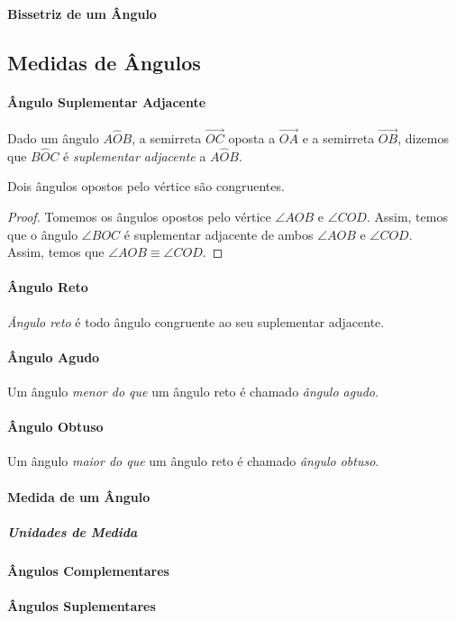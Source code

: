     \paragraph{Bissetriz de um Ângulo}
\subsection{Medidas de Ângulos}
	\paragraph{Ângulo Suplementar Adjacente}
    Dado um ângulo $A\hat{O}B$, a semirreta $\overrightarrow{OC}$ oposta a $\overrightarrow{OA}$ e a semirreta $\overrightarrow{OB}$, dizemos que $B\hat{O}C$ é \emph{suplementar adjacente} a $A\hat{O}B$. 
    \begin{prop}
Dois ângulos opostos pelo vértice são congruentes.
\begin{proof}
Tomemos os ângulos opostos pelo vértice $\angle AOB$ e $\angle COD$. Assim, temos que o ângulo $\angle BOC$ é suplementar adjacente de ambos $\angle AOB$ e $\angle COD$.\\
Assim, temos que $\angle AOB \equiv \angle COD$.
\end{proof}
\end{prop}
    \paragraph{Ângulo Reto} \emph{Ângulo reto} é todo ângulo congruente ao seu suplementar adjacente.
    \paragraph{Ângulo Agudo} Um ângulo \emph{menor do que} um ângulo reto é chamado \emph{ângulo agudo}.
    \paragraph{Ângulo Obtuso} Um ângulo \emph{maior do que} um ângulo reto é chamado \emph{ângulo obtuso}.
    \paragraph{Medida de um Ângulo} 
    \subparagraph{Unidades de Medida} 
    \paragraph{Ângulos Complementares} 
    \paragraph{Ângulos Suplementares} 